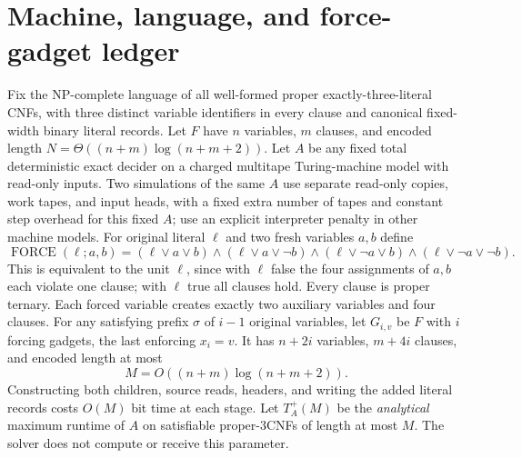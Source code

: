 \documentclass[11pt]{article}
\begin{document}
\section{Machine, language, and force-gadget ledger}
Fix the NP-complete language of all well-formed proper exactly-three-literal CNFs, with three distinct variable identifiers in every clause and canonical fixed-width binary literal records. Let $F$ have $n$ variables, $m$ clauses, and encoded length $N=\Theta((n+m)\log(n+m+2))$. Let $A$ be any fixed total deterministic exact decider on a charged multitape Turing-machine model with read-only inputs. Two simulations of the same $A$ use separate read-only copies, work tapes, and input heads, with a fixed extra number of tapes and constant step overhead for this fixed $A$; use an explicit interpreter penalty in other machine models.
For original literal $\ell$ and two fresh variables $a,b$ define
\[
\operatorname{FORCE}(\ell;a,b)=
(\ell\vee a\vee b)\wedge(\ell\vee a\vee\neg b)
\wedge(\ell\vee\neg a\vee b)\wedge(\ell\vee\neg a\vee\neg b).
\tag{1}
\]
This is equivalent to the unit $\ell$, since with $\ell$ false the four assignments of $a,b$ each violate one clause; with $\ell$ true all clauses hold. Every clause is proper ternary. Each forced variable creates exactly two auxiliary variables and four clauses.
For any satisfying prefix $\sigma$ of $i-1$ original variables, let $G_{i,v}$ be $F$ with $i$ forcing gadgets, the last enforcing $x_i=v$. It has $n+2i$ variables, $m+4i$ clauses, and encoded length at most
\[
M=O((n+m)\log(n+m+2)).
\tag{2}
\]
Constructing both children, source reads, headers, and writing the added literal records costs $O(M)$ bit time at each stage. Let $T_A^+(M)$ be the \emph{analytical} maximum runtime of $A$ on satisfiable proper-3CNFs of length at most $M$. The solver does not compute or receive this parameter.
\end{document}
